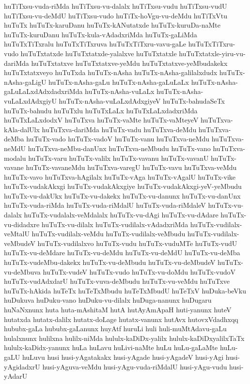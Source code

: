 {huTiTxsu-vuda-riMda
huTiTxsu-vu-dalalx
huTiTxsu-vudu
huTiTxsu-vudU
huTiTxsu-vu-deMdU
huTiTxsu-vudo
huTiTx-hoVgu-vu-deMdu
huTiTxVtu
huTuTx
huTuTx-karuDanu
huTuTx-kANutatxde
huTuTx-kuruDa-naMte
huTuTx-kuruDanu
huTuTx-kula-vAdadxriMda
huTuTx-gaLiMda
huTuTxTiTxralu
huTuTxTiTxruva
huTuTxTiTxru-vavu-gaLe
huTuTxTiTxru-vudo
huTuTxtatxde
huTuTxtatxde-yalalxve
huTuTxtatxle
huTuTxtatxle-yiru-vu-dariMda
huTuTxtatxve
huTuTxtatxve-yeMdu
huTuTxtatxve-yeMbudakekx
huTuTxtatxveyo
huTuTxda
huTuTx-nAsha
huTuTx-nAsha-galilalxdudx
huTuTx-nAsha-gaLigU
huTuTx-nAsha-gaLu
huTuTx-nAsha-gaLuLaLx
huTuTx-nAsha-gaLuLaLxdAdxdadxriMda
huTuTx-nAsha-vuLaLx
huTuTx-nAsha-vuLaLxdAdxgiyU
huTuTx-nAsha-vuLaLxdAdxgiyeV
huTuTx-bahudaSeTx
huTuTx-bahudu
huTuTxlu
huTuTxLaLx
huTuTxLaLxdadxriMda
huTuTxLaLxdodxV
huTuTxva
huTuTx-vaMte
huTuTx-vaMteyeV
huTuTxva-kAla-dalUlx
huTuTxva-dariMda
huTuTx-vadu
huTuTxva-deMdu
huTuTxva-deMba
huTuTx-vado
huTuTx-vadoV
huTuTx-vanu
huTuTxva-neMdu
huTuTxva-neMdU
huTuTxva-neMbu-danUnx
huTuTxva-neMbudu
huTuTx-vano
huTuTxva-modalu
huTuTx-varu
huTuTx-valilx
huTuTx-vavanu
huTuTx-vavanU
huTuTx-vavane
huTuTx-vavaneMdu
huTuTxva-varegU
huTuTx-vavu
huTuTxva-veMdu
huTuTx-vavo
huTuTxva-hAgilalx
huTuTx-vAga
huTuTx-vAgalU
huTuTx-vike
huTuTx-vudakAkxgi
huTuTx-vudakAkxgiye
huTuTx-vudakAkxgi-yeV-yeMbudu
huTuTx-vu-dakUkx
huTuTx-vu-dakekx
huTuTx-vu-danunx
huTuTx-vu-danUnx
huTuTx-vuda-riMda
huTuTx-vuda-riMdalU
huTuTx-vuda-riMdaleV
huTuTx-vu-dalalx
huTuTx-vudalalx-veMdalalx
huTuTx-vu-dAgi
huTuTx-vu-dAdare
huTuTx-vu-didadxre
huTuTx-vu-dilalx
huTuTx-vudilalx-vAdadxriMda
huTuTx-vudilalx-veMtalU
huTuTx-vudilalx-veMdu
huTuTx-vudilalx-veMbudu
huTuTx-vudilalx-veMbudeV
huTuTx-vudilalxvo
huTuTx-vudu
huTuTx-vuduMTe
huTuTx-vudU
huTuTx-vu-deMdare
huTuTx-vu-deMdu
huTuTx-vu-deMdU
huTuTx-vu-deMba
huTuTx-vudeMbu-dakekx
huTuTx-vu-deMbudu
huTuTx-vu-deMbudeV
huTuTx-vu-deMbuva
huTuTx-vudeV
huTuTx-vudo
huTuTx-vu-doMdu
huTuTx-vudoV
huTuTx-vudAdxdarU
huTuTx-vuva-deMbudu
huTuTx-vu-veMdu
huTuTxve
huTuTx-hAkida
huTeTx
huTeTxMbudu
huTeTxMbudU
huTeTxV
huDuka-beVku
huDukuva
huDuku-vano
huDuku-vu-dilalx
huDuga-nanunx
huDugaru
huNaNxnunx
huta
huta-mAshitaM
hutA
hutAyAmApaH
huti-yanunx
huteV
hutatxda
hutatx-dalilx
hutatx-doLage
hutatx-vanunx
hutAvx
hutovxVdadhxqq
hububx-gaLa
hububx-gaLanunx
huyAtf
huruLi
huli
huli-muMtAdavu-gaLu
hulalxnunx
hulilxna
hulilx-niMda
hululx-kaDiDx-yalilx
hululx-kaDiDxyalilxTaTx
hululx-kaDidx-yanunx
huLa
huLavu
huLivi-naMte
huLu
huLu-gaLaMte
huLu-gaLU
huLuvu
husi
husi-yAgatakakx
husi-yAgade
husi-yAgadeV
husi-yAgi
husi-yAgidadxrU
husi-yAguva-veMdu
husi-yAgu-vuda-riMdalU
husi-yAgu-vudu
husi-yAdarU
}
